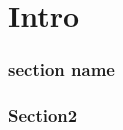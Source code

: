 \part{Intro}

\section{section name}
\label{sec:section_name}

\section{Section2}
\label{sec:section2}
